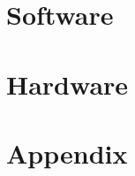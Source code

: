 \documentclass[a4paper]{article}
\begin{document}


\section{Software}








\section{Hardware}
%
%
%
%
%
%



\section{Appendix}








\listoffigures
\listoftables
\listoftodos
\end{document}

